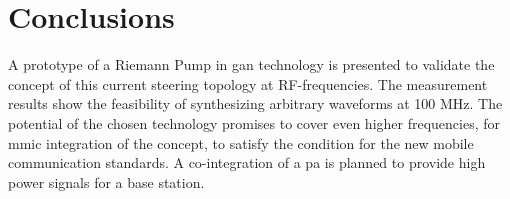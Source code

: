 \documentclass[journal]{IEEEtran}
\begin{document}
\section{Conclusions}
\label{sec:conclusion}
A prototype of a Riemann Pump in \gls{gan} technology is presented to validate the concept of this current steering topology at RF-frequencies.
The measurement results show the feasibility of synthesizing arbitrary waveforms at 100 MHz.
The potential of the chosen technology promises to cover even higher frequencies, for \gls{mmic} integration 
of the concept, to satisfy the condition for the new mobile communication standards.
A co-integration of a \gls{pa} is planned to provide high power signals for a base station.






\end{document}
